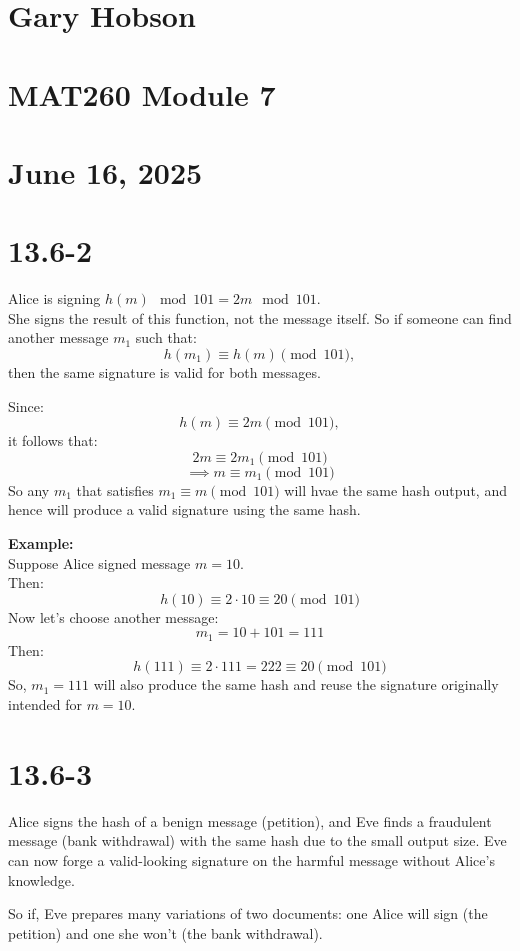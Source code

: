 \documentclass[12pt]{article}
\begin{document}
\section*{Gary Hobson}
\section*{MAT260 Module 7}
\section*{June 16, 2025}
\newpage


\section*{13.6-2}
Alice is signing \( h(m) \mod 101 = 2m \mod 101 \). \\
She signs the result of this function, not the message itself. So if someone can find another message \( m_1 \) such that:
\[
h(m_1) \equiv h(m) \pmod{101},
\]
then the same signature is valid for both messages.

Since:
\[
h(m) \equiv 2m \pmod{101},
\]
it follows that:
\[
2m \equiv 2m_1 \pmod{101}
\]
\[
\implies m \equiv m_1 \pmod{101}
\]
So any \( m_1 \) that satisfies \( m_1 \equiv m \pmod{101} \) will hvae the same hash output, and hence will produce a valid signature using the same hash.

\textbf{Example:} \\
Suppose Alice signed message \( m = 10 \). \\
Then:
\[
h(10) \equiv 2 \cdot 10 \equiv 20 \pmod{101}
\]
Now let's choose another message:
\[
m_1 = 10 + 101 = 111
\]
Then:
\[
h(111) \equiv 2 \cdot 111 = 222 \equiv 20 \pmod{101}
\]
So, \( m_1 = 111 \) will also produce the same hash and reuse the signature originally intended for \( m = 10 \).

\newpage





\section*{13.6-3}

Alice signs the hash of a benign message (petition), and Eve finds a fraudulent message (bank withdrawal) with the same hash due to the small output size. Eve can now forge a valid-looking signature on the harmful message without Alice's knowledge.

So if,
Eve prepares many variations of two documents: one Alice will sign (the petition) and one she won't (the bank withdrawal).
\end{document}
